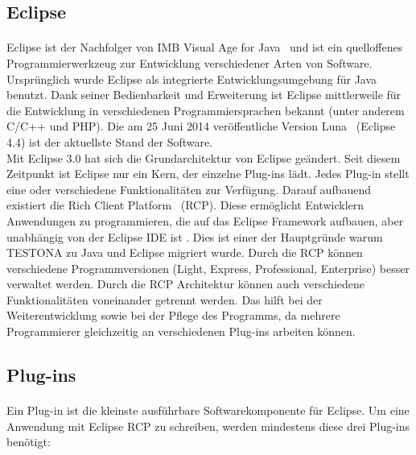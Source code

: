 \subsection{Eclipse}
\paragraph{}
Eclipse ist der Nachfolger von \glqq IMB Visual Age for Java\grqq~ und ist ein quelloffenes Programmierwerkzeug zur Entwicklung verschiedener Arten von Software. Ursprünglich wurde Eclipse als integrierte Entwicklungsumgebung für Java benutzt. Dank seiner Bedienbarkeit und Erweiterung ist Eclipse mittlerweile für die Entwicklung in verschiedenen Programmiersprachen bekannt (unter anderem C/C++ und PHP). Die am 25 Juni 2014 veröffentliche Version \glqq Luna\grqq~ (Eclipse 4.4) ist der aktuellste Stand der Software. \\

Mit Eclipse 3.0 hat sich die Grundarchitektur von Eclipse geändert. Seit diesem Zeitpunkt ist Eclipse nur ein Kern, der einzelne Plug-ins lädt. Jedes Plug-in stellt eine oder verschiedene Funktionalitäten zur Verfügung. Darauf aufbauend existiert die \glqq Rich Client Platform\grqq~ (RCP). Diese ermöglicht Entwicklern Anwendungen zu programmieren, die auf das Eclipse Framework aufbauen, aber unabhängig von der Eclipse IDE ist\cite{EclipseRCP} \cite{Eclipse}. Dies ist einer der Hauptgründe warum TESTONA zu Java und Eclipse migriert wurde. Durch die RCP können verschiedene Programmversionen (Light, Express, Professional, Enterprise) besser verwaltet werden. Durch die RCP Architektur können auch verschiedene Funktionalitäten voneinander getrennt werden. Das hilft bei der Weiterentwicklung sowie bei der Pflege des Programms, da mehrere Programmierer gleichzeitig an verschiedenen Plug-ins arbeiten können.\\



\subsection{Plug-ins}
\paragraph{}
Ein Plug-in ist die kleinste ausführbare Softwarekomponente für Eclipse. Um eine Anwendung mit Eclipse RCP zu schreiben, werden mindestens diese drei Plug-ins benötigt:

